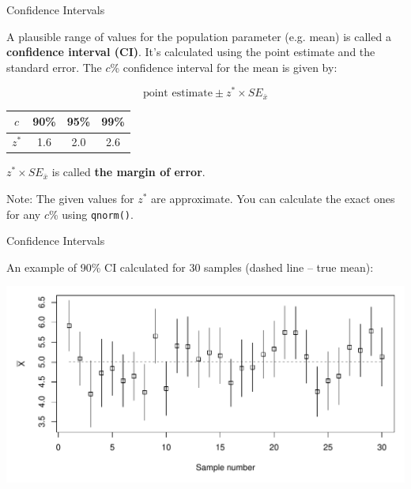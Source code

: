 \begin{frame}{Confidence Intervals}

    A plausible range of values for the population parameter (e.g. mean) is called a \textbf{confidence interval (CI)}. It's calculated using the point estimate and the standard error. The $c$\% confidence interval for the mean is given by:

    \begin{equation}
    \text{point estimate} \pm z^* \times SE_{\bar{x}}
    \end{equation}
    
    \begin{table}
        \begin{tabular}{c | c c c}
            $c$ & 90\% & 95\% & 99\% \\ \hline
            $z^*$ & 1.6 & 2.0 & 2.6 \\
        \end{tabular}
    \end{table}
    
    $z^* \times SE_{\bar{x}}$ is called \textbf{the margin of error}.
    
    {\tiny Note: The given values for $z^*$ are approximate. You can calculate the exact ones for any $c$\% using \texttt{qnorm()}.}

\end{frame}

\begin{frame}{Confidence Intervals}

    An example of 90\% CI calculated for 30 samples (dashed line -- true mean):

    \includegraphics[width=\linewidth]{R/plots/CI}

\end{frame}

